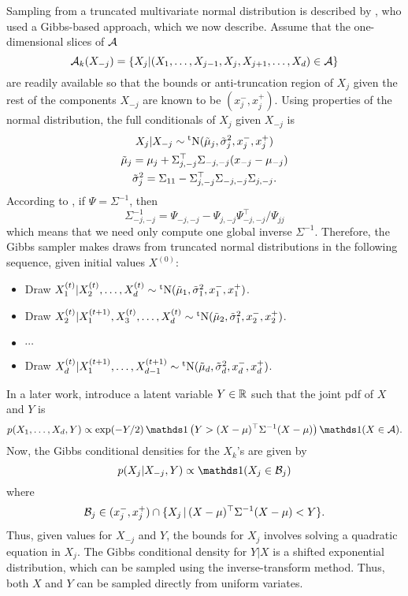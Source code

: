 Sampling from a truncated multivariate normal distribution is described by \citet{robert1995simulation}, who used a Gibbs-based approach, which we now describe.
Assume that the one-dimensional slices of ${\mathcal A}$ 
\[
  {\mathcal A}_k(X_{-j}) = \{X_j | (X_1,\dots,X_{j-1},X_j, X_{j+1},\dots,X_d) \in {\mathcal A} \}
\]
are readily available so that the bounds or anti-truncation region of $X_j$ given the rest of the components $X_{-j}$ are known to be $(x_j^-, x_j^+)$.
Using properties of the normal distribution, the full conditionals of $X_j$ given $X_{-j}$ is
\begin{gather*}
  X_j|X_{-j} \sim \operatorname{{}^tN}(\tilde\mu_j,\tilde\sigma_j^2, x_j^-, x_j^+) \\
  \tilde\mu_j = \mu_{j} + \Sigma_{j,-j}^\top\Sigma_{-j,-j}(x_{-j} - \mu_{-j}) \\
  \tilde\sigma_j^2 = \Sigma_{11} - \Sigma_{j,-j}^\top \Sigma_{-j,-j} \Sigma_{j,-j}.
\end{gather*}
According to \citet{robert1995simulation}, if $\Psi = \Sigma^{-1}$, then 
\[
  \Sigma_{-j,-j}^{-1} = \Psi_{-j,-j} - \Psi_{j,-j}\Psi_{-j,-j}^\top / \Psi_{jj}
\]
which means that we need only compute one global inverse $\Sigma^{-1}$.
Therefore, the Gibbs sampler makes draws from truncated normal distributions in the following sequence, given initial values $X^{(0)}$:
\begin{itemize}
  \item Draw $X^{(t)}_1|X^{(t)}_2,\dots,X^{(t)}_d \sim \operatorname{{}^tN}(\tilde\mu_1,\tilde\sigma_1^2, x_1^-, x_1^+)$.
  \item Draw $X^{(t)}_2|X^{(t+1)}_1,X^{(t)}_3,\dots,X^{(t)}_d \sim \operatorname{{}^tN}(\tilde\mu_2,\tilde\sigma_1^2, x_2^-, x_2^+)$.
  \item $\cdots$
  \item Draw $X^{(t)}_d|X^{(t+1)}_1,\dots,X^{(t+1)}_{d-1} \sim \operatorname{{}^tN}(\tilde\mu_d,\tilde\sigma_d^2, x_d^-, x_d^+)$.
\end{itemize}

In a later work, \citet{damien2001sampling} introduce a latent variable $Y \in \mathbb{R}$ such that the joint pdf of $X$ and $Y$ is
\[
  p(X_1,\dots,X_d,Y) \propto \exp(-Y/2) \ind\big( Y > (X-\mu)^\top\Sigma^{-1}(X-\mu)\big)\ind(X\in\cA).
\]
Now, the Gibbs conditional densities for the $X_k$'s are given by
\[
  p(X_j|X_{-j},Y) \propto \ind(X_j \in \cB_j)
\]
where
\[
  {\mathcal B}_j \in (x_j^-, x_j^+) \cap \{X_j \,|\, (X-\mu)^\top\Sigma^{-1}(X-\mu) < Y \}.
\]
Thus, given values for $X_{-j}$ and $Y$, the bounds for $X_j$ involves solving a quadratic equation in $X_j$.
The Gibbs conditional density for $Y|X$ is a shifted exponential distribution, which can be sampled using the inverse-transform method.
Thus, both $X$ and $Y$ can be sampled directly from uniform variates.

